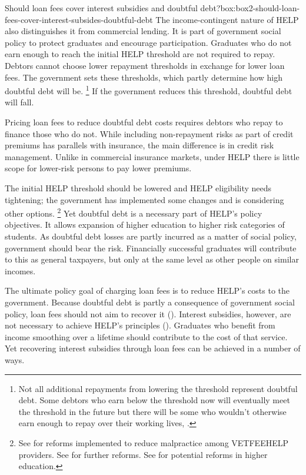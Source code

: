 \documentclass[embargoed]{grattan}
\begin{document}
\begin{bigbox*}{Should loan fees cover interest subsidies and doubtful debt?}{box:box2-should-loan-fees-cover-interest-subsides-doubtful-debt}
The income-contingent nature of \gls{HELP} also distinguishes it from commercial lending.
It is part of government social policy to protect graduates and encourage participation.
Graduates who do not earn enough to reach the initial \gls{HELP} threshold are not required to repay.
Debtors cannot choose lower repayment thresholds in exchange for lower loan fees.
The government sets these thresholds, which partly determine how high doubtful debt will be.%
\footnote{Not all additional repayments from lowering the threshold represent doubtful debt.
Some debtors who earn below the threshold now will eventually meet the threshold in the future but there will be some who wouldn't otherwise earn enough to repay over their working lives, \textcite[][Figure~16]{Norton2014Doubtfuldebtrising}.} 
If the government reduces this threshold, doubtful debt will fall.

Pricing loan fees to reduce doubtful debt costs requires debtors who repay to finance those who do not.
While including non-repayment risks as part of credit premiums has parallels with insurance, the main difference is in credit risk management.
Unlike in commercial insurance markets, under \gls{HELP} there is little scope for lower-risk persons to pay lower premiums.

The initial \gls{HELP} threshold should be lowered and \gls{HELP} eligibility needs tightening; the government has implemented some changes and is considering other options.%
\footnote{See \textcite{Ryan2016RedesigningVETFEE} for reforms implemented to reduce malpractice among \gls{VETFEEHELP} providers.
See \textcite{Birmingham2016MediareleaseNew} for further reforms.
See \textcite{Education2016DrivingInnovationFairness} for potential reforms in higher education.} 
Yet doubtful debt is a necessary part of \gls{HELP}'s policy objectives.
It allows expansion of higher education to higher risk categories of students.
As doubtful debt losses are partly incurred as a matter of social policy, government should bear the risk.
Financially successful graduates will contribute to this as general taxpayers, but only at the same level as other people on similar incomes.
\end{bigbox*}

The ultimate policy goal of charging loan fees is to reduce \gls{HELP}'s costs to the government.
Because doubtful debt is partly a consequence of government social policy, loan fees should not aim to recover it ().
Interest subsidies, however, are not necessary to achieve \gls{HELP}'s principles ().
Graduates who benefit from income smoothing over a lifetime should contribute to the cost of that service.
Yet recovering interest subsidies through loan fees can be achieved in a number of ways.
\end{document}
